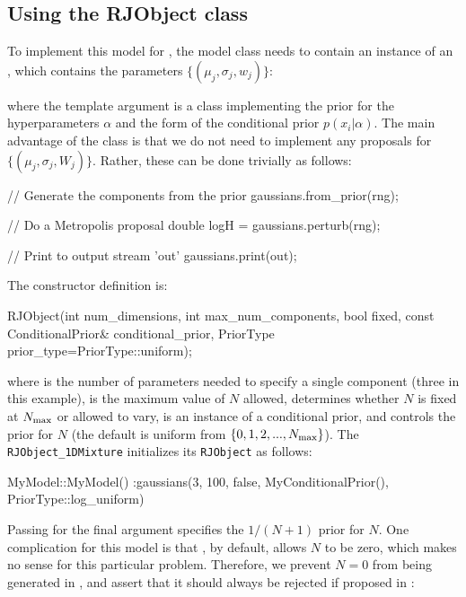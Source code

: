 \documentclass[article]{jss}
\begin{document}
\subsection{Using the RJObject class}
To implement this model for , the model
class needs to contain an instance of an
, which contains the parameters
$\{(\mu_j, \sigma_j, w_j)\}$:
\begin{CodeChunk}
\begin{CodeInput}
class MyModel
{
    private:
        DNest4::RJObject<MyConditionalPrior> gaussians;
....
\end{CodeInput}
\end{CodeChunk}
where the template argument 
is a class implementing the prior for the hyperparameters
$\alpha$ and the form of the conditional prior $p(x_i | \alpha)$.
The main advantage of the  class is that
we do not need to implement any proposals for $\{(\mu_j, \sigma_j, W_j)\}$.
Rather, these can be done trivially as follows:
\begin{CodeChunk}
\begin{CodeInput}
    // Generate the components from the prior
    gaussians.from_prior(rng);

    // Do a Metropolis proposal
    double logH = gaussians.perturb(rng);

    // Print to output stream 'out'
    gaussians.print(out);
\end{CodeInput}
\end{CodeChunk}

The  constructor definition is:
\begin{CodeChunk}
\begin{CodeInput}
RJObject(int num_dimensions, int max_num_components, bool fixed,
         const ConditionalPrior& conditional_prior,
         PriorType prior_type=PriorType::uniform);
\end{CodeInput}
\end{CodeChunk}
where  is the number of parameters needed to
specify a single component (three in this example), 
is the maximum value of $N$ allowed,  determines whether
$N$ is fixed at $N_{\rm max}$ or allowed to vary,
 is an instance of a conditional prior,
and  controls the prior for $N$ (the default is uniform
from $\{0, 1, 2, ..., N_{\rm max}\}$). The {\tt RJObject\_1DMixture}
 initializes its {\tt RJObject} as follows:
\begin{CodeChunk}
\begin{CodeInput}
MyModel::MyModel()
:gaussians(3, 100, false, MyConditionalPrior(), PriorType::log_uniform)
{
}
\end{CodeInput}
\end{CodeChunk}
Passing  for the final argument
specifies the $1/(N+1)$ prior for $N$.
One complication for this model is that , by default,
allows $N$ to be zero, which makes no sense for this particular
problem. Therefore, we prevent $N=0$ from being generated in
, and assert that it should always be
rejected if proposed in :
\end{document}
